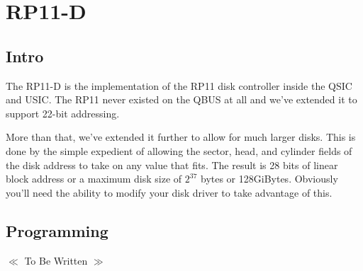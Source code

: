 %

\chapter{RP11-D}
\section{Intro}
The RP11-D is the implementation of the RP11 disk controller inside
the QSIC and USIC.  The RP11 never existed on the QBUS at all and
we've extended it to support 22-bit addressing.

More than that, we've extended it further to allow for much larger
disks.  This is done by the simple expedient of allowing the sector,
head, and cylinder fields of the disk address to take on any value
that fits.  The result is 28 bits of linear block address or a maximum
disk size of $2^{37}$ bytes or 128GiBytes.  Obviously you'll need the
ability to modify your disk driver to take advantage of this.

\section{Programming}

\begin{center}
  $\ll$ To Be Written $\gg$
\end{center}
